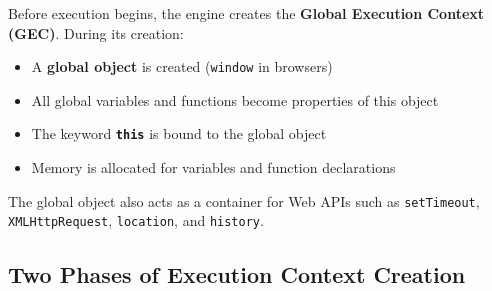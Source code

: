 \documentclass{scrbook}
\begin{document}
Before execution begins, the engine creates the \textbf{Global Execution Context (GEC)}. During its creation:

\begin{itemize}
    \item A \textbf{global object} is created (\texttt{window} in browsers)
    \item All global variables and functions become properties of this object
    \item The keyword \textbf{\texttt{this}} is bound to the global object
    \item Memory is allocated for variables and function declarations
\end{itemize}

The global object also acts as a container for Web APIs such as \texttt{setTimeout}, \texttt{XMLHttpRequest}, \texttt{location}, and \texttt{history}.

\subsection{Two Phases of Execution Context Creation}
\end{document}

